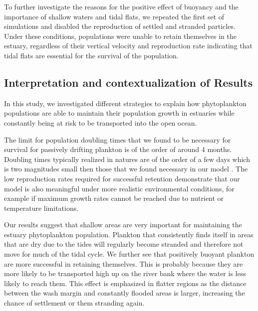 \documentclass[npg, manuscript]{copernicus}
\begin{document}
To further investigate the reasons for the positive effect of buoyancy and the importance of shallow waters and tidal flats, we repeated the first set of simulations and disabled the reproduction of settled and stranded particles.
Under these conditions, populations were unable to retain themselves in the estuary, regardless of their vertical velocity and reproduction rate indicating that tidal flats are essential for the survival of the population.




\subsection{Interpretation and contextualization of Results}

In this study, we investigated different strategies to explain how phytoplankton populations are able to maintain their population growth in estuaries while constantly being at risk to be transported into the open ocean.

The limit for population doubling times that we found to be necessary for survival for passively drifting plankton is of the order of around 4 months. Doubling times typically realized in natures are of the order of a few days which is two magnitudes small then those that we found necessary in our model \citep{Koch2004,Wirtz2011}.
The low reproduction rates required for successful retention demonstrate that our model is also meaningful under more realistic environmental conditions, for example if maximum growth rates cannot be reached due to nutrient or temperature limitations.

Our results suggest that shallow areas are very important for maintaining the estuary phytoplankton population.
Plankton that consistently finds itself in areas that are dry due to the tides will regularly become stranded and therefore not move for much of the tidal cycle.
We further see that positively buoyant plankton are more successful in retaining themselves. 
This is probably because they are more likely to be transported high up on the river bank where the water is less likely to reach them.
This effect is emphasized in flatter regions as the distance between the wash margin and constantly flooded areas is larger, increasing the chance of settlement or them stranding again.
\end{document}

